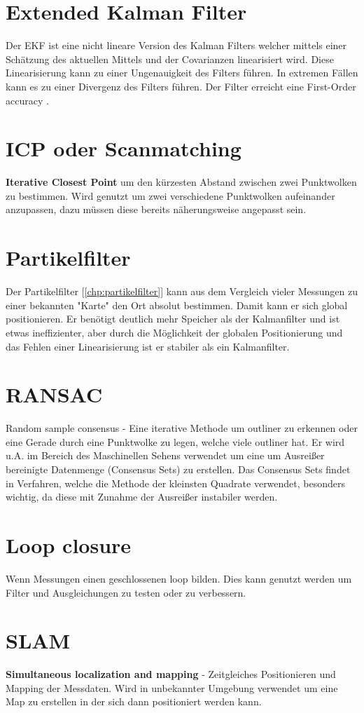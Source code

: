 \section{Extended Kalman Filter}
\label{chp:stoffübersicht:sec:ExtendedKalmanFilter}
Der EKF ist eine nicht lineare Version des Kalman Filters welcher mittels einer Schätzung des 
aktuellen Mittels und der Covarianzen linearisiert wird. Diese Linearisierung kann zu einer Ungenauigkeit des Filters führen. In extremen Fällen kann es zu einer Divergenz des Filters führen. Der Filter erreicht eine First-Order accuracy \cite{order-accuracy}.

\section{ICP oder Scanmatching}
\label{chp:stoffübersicht:sec:ICPoderScanmatching}
\textbf{Iterative Closest Point} um den kürzesten Abstand zwischen zwei Punktwolken zu bestimmen. Wird genutzt um zwei verschiedene Punktwolken aufeinander anzupassen, dazu müssen diese bereits näherungsweise angepasst sein.

\section{Partikelfilter}
\label{chp:stoffübersicht:sec:Partikelfilter}
Der Partikelfilter [\ref{chp:partikelfilter}] kann aus dem Vergleich vieler Messungen zu einer bekannten "Karte" den Ort absolut bestimmen. Damit kann er sich global positionieren. Er benötigt deutlich mehr Speicher als der Kalmanfilter und ist etwas ineffizienter, aber durch die Möglichkeit der globalen Positionierung und das Fehlen einer Linearisierung ist er stabiler als ein Kalmanfilter.

\section{RANSAC}
\label{chp:stoffübersicht:sec:RANSAC}
Random sample consensus - Eine iterative Methode um outliner zu erkennen oder eine Gerade durch eine Punktwolke zu legen, welche viele outliner hat. Er wird u.A. im Bereich des Maschinellen Sehens verwendet um eine um Ausreißer bereinigte Datenmenge (Consensus Sets) zu erstellen. Das Consensus Sets findet in Verfahren, welche die Methode der kleinsten Quadrate verwendet, besonders wichtig, da diese mit Zunahme der Ausreißer instabiler werden.

\section{Loop closure}
\label{chp:stoffübersicht:sec:LoopClosure}
Wenn Messungen einen geschlossenen loop bilden. Dies kann genutzt werden um Filter und Ausgleichungen zu testen oder zu verbessern.

\section{SLAM}
\label{chp:stoffübersicht:sec:SLAM}
\textbf{Simultaneous localization and mapping} - Zeitgleiches Positionieren und Mapping der Messdaten. Wird in unbekannter Umgebung verwendet um eine Map zu erstellen in der sich dann positioniert werden kann.

